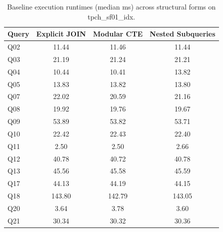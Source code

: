 \begin{table}[h]
\centering
\small
\begin{tabular}{lccc}
\toprule
\textbf{Query} & \textbf{Explicit JOIN} & \textbf{Modular CTE} & \textbf{Nested Subqueries} \\
\midrule
Q02 & 11.44 & 11.46 & 11.44 \\
Q03 & 21.19 & 21.24 & 21.21 \\
Q04 & 10.44 & 10.41 & 13.82 \\
Q05 & 13.83 & 13.82 & 13.80 \\
Q07 & 22.02 & 20.59 & 21.16 \\
Q08 & 19.92 & 19.76 & 19.67 \\
Q09 & 53.89 & 53.82 & 53.71 \\
Q10 & 22.42 & 22.43 & 22.40 \\
Q11 & 2.50 & 2.50 & 2.66 \\
Q12 & 40.78 & 40.72 & 40.78 \\
Q13 & 45.56 & 45.58 & 45.59 \\
Q17 & 44.13 & 44.19 & 44.15 \\
Q18 & 143.80 & 142.79 & 143.05 \\
Q20 & 3.64 & 3.78 & 3.60 \\
Q21 & 30.34 & 30.32 & 30.36 \\
\bottomrule
\end{tabular}
\caption{Baseline execution runtimes (median ms) across structural forms on tpch_sf01_idx.}
\label{tab:baseline_tpch_sf01_idx}
\end{table}
